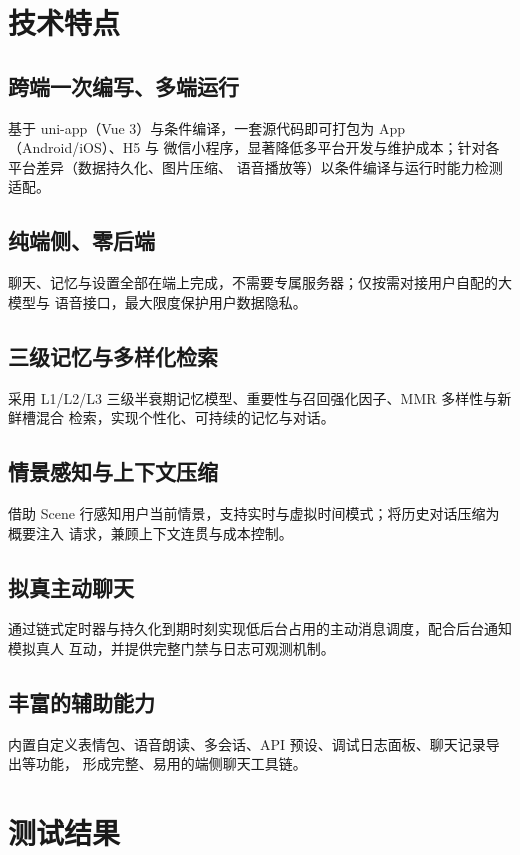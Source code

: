 \documentclass[zihao=5,a4paper]{ctexart}
\begin{document}
\section{技术特点}

\subsection{跨端一次编写、多端运行}
基于 uni-app（Vue 3）与条件编译，一套源代码即可打包为 App（Android/iOS）、H5 与
微信小程序，显著降低多平台开发与维护成本；针对各平台差异（数据持久化、图片压缩、
语音播放等）以条件编译与运行时能力检测适配。

\subsection{纯端侧、零后端}
聊天、记忆与设置全部在端上完成，不需要专属服务器；仅按需对接用户自配的大模型与
语音接口，最大限度保护用户数据隐私。

\subsection{三级记忆与多样化检索}
采用 L1/L2/L3 三级半衰期记忆模型、重要性与召回强化因子、MMR 多样性与新鲜槽混合
检索，实现个性化、可持续的记忆与对话。

\subsection{情景感知与上下文压缩}
借助 Scene 行感知用户当前情景，支持实时与虚拟时间模式；将历史对话压缩为概要注入
请求，兼顾上下文连贯与成本控制。

\subsection{拟真主动聊天}
通过链式定时器与持久化到期时刻实现低后台占用的主动消息调度，配合后台通知模拟真人
互动，并提供完整门禁与日志可观测机制。

\subsection{丰富的辅助能力}
内置自定义表情包、语音朗读、多会话、API 预设、调试日志面板、聊天记录导出等功能，
形成完整、易用的端侧聊天工具链。

\section{测试结果}
\end{document}

